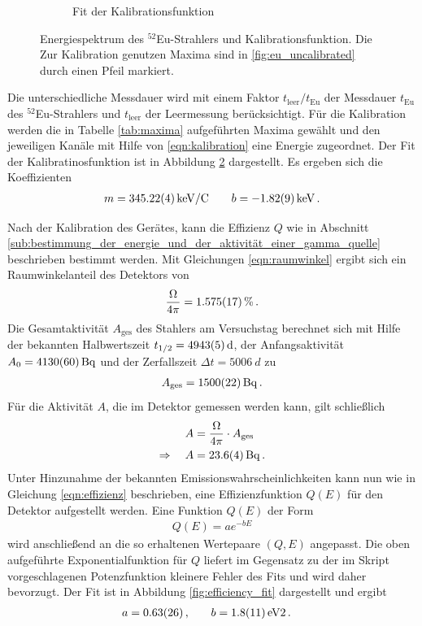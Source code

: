 \begin{figure}[htb]
\begin{subfigure}{.49\linewidth}
        \caption{
            Fit der Kalibrationsfunktion
        }
        \label{fig:calibration}
    \end{subfigure}
    \caption{
        Energiespektrum des $^{52}$Eu-Strahlers und Kalibrationsfunktion. Die Zur Kalibration genutzen Maxima sind in \ref{fig:eu_uncalibrated} durch einen Pfeil markiert.
    }
\end{figure}
Die unterschiedliche Messdauer wird mit einem Faktor $t_\text{leer} / t_\text{Eu}$ der Messdauer $t_\text{Eu}$ des $^{52}$Eu-Strahlers und $t_\text{leer}$ der Leermessung berücksichtigt.
Für die Kalibration werden die in Tabelle \ref{tab:maxima} aufgeführten Maxima gewählt und den jeweiligen Kanäle mit Hilfe von \eqref{eqn:kalibration} eine Energie zugeordnet. Der Fit der Kalibratinosfunktion ist in Abbildung \ref{fig:calibration} dargestellt.
Es ergeben sich die Koeffizienten
%
\begin{align*}
     m = \SI{345.22+-0.04}{keV/C} \qquad b = \SI{-1.82+-0.09}{keV} \,.
\end{align*}

Nach der Kalibration des Gerätes, kann die Effizienz $Q$ wie in Abschnitt \ref{sub:bestimmung_der_energie_und_der_aktivität_einer_gamma_quelle} beschrieben bestimmt werden. Mit Gleichungen \eqref{eqn:raumwinkel} ergibt sich ein Raumwinkelanteil des Detektors von
\begin{align*}
    \frac{\Omega}{4\pi} = \SI{1.575+-0.017}{\percent}\,.
\end{align*}
Die Gesamtaktivität $A_\text{ges}$ des Stahlers am Versuchstag berechnet sich mit Hilfe der bekannten Halbwertszeit $t_{1/2} = \SI{4943+-5}{d}$, der Anfangsaktivität $A_0 = \SI{4130+-60}{\becquerel}$ und der Zerfallszeit $\Delta t = \SI{5006}{d}$ zu
\begin{align*}
    A_\text{ges} = \SI{1500+-22}{\becquerel}\,.
\end{align*}
Für die Aktivität $A$, die im Detektor gemessen werden kann, gilt schließlich
\begin{align*}
    A &= \frac{\Omega}{4\pi}\cdot A_\text{ges}\,\\
    \Rightarrow \quad A &= \SI{23.6+-0.4}{\becquerel}\,.
\end{align*}
Unter Hinzunahme der bekannten Emissionswahrscheinlichkeiten kann nun wie in Gleichung \eqref{eqn:effizienz} beschrieben, eine Effizienzfunktion $Q(E)$ für den Detektor aufgestellt werden.
Eine Funktion $Q(E)$ der Form
\begin{align*}
    Q(E) = ae^{-bE}
\end{align*}
wird anschließend an die so erhaltenen Wertepaare $(Q,E)$ angepasst. Die oben aufgeführte Exponentialfunktion für $Q$ liefert im Gegensatz zu der im Skript vorgeschlagenen Potenzfunktion kleinere Fehler des Fits und wird daher bevorzugt. Der Fit ist in Abbildung \ref{fig:efficiency_fit} dargestellt und ergibt
\begin{align*}
    a &= \num{0.63+-0.26}\,, &\quad b &= \SI{1.8+-1.1}{\per eV} 2\,.
\end{align*}

